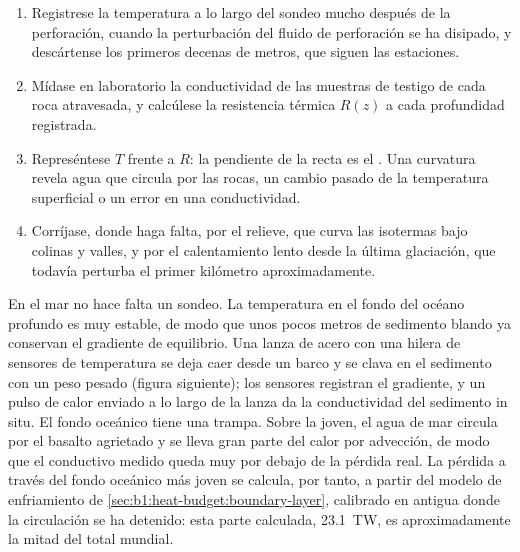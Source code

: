 \begin{method}\label{met:b1:heat-budget:borehole}
\begin{enumerate}
  \item Registrese la temperatura a lo largo del sondeo mucho después de la perforación, cuando la perturbación del fluido de
        perforación se ha disipado, y descártense los primeros decenas de metros, que siguen las estaciones.
  \item Mídase en laboratorio la conductividad de las muestras de testigo de cada roca atravesada, y calcúlese la resistencia
        térmica $R(z)$ a cada profundidad registrada.
  \item Represéntese $T$ frente a $R$: la pendiente de la recta es el . Una curvatura revela agua que circula por
        las rocas, un cambio pasado de la temperatura superficial o un error en una conductividad.
  \item Corríjase, donde haga falta, por el relieve, que curva las isotermas bajo colinas y valles, y por el calentamiento lento
        desde la última glaciación, que todavía perturba el primer kilómetro aproximadamente.
\end{enumerate}
\end{method}

En el mar no hace falta un sondeo. La temperatura en el fondo del océano profundo es muy estable, de modo que unos pocos metros de
sedimento blando ya conservan el gradiente de equilibrio. Una lanza de acero con una hilera de sensores de temperatura se deja
caer desde un barco y se clava en el sedimento con un peso pesado (figura siguiente); los sensores registran el gradiente, y un
pulso de calor enviado a lo largo de la lanza da la conductividad del sedimento in situ. El fondo oceánico tiene una trampa. Sobre
la  joven, el agua de mar circula por el basalto agrietado y se lleva gran parte del calor por advección, de modo que el
 conductivo medido queda muy por debajo de la pérdida real. La pérdida a través del fondo oceánico más joven se
calcula, por tanto, a partir del modelo de enfriamiento de \cref{sec:b1:heat-budget:boundary-layer}, calibrado en  antigua
donde la circulación se ha detenido: esta parte calculada, \qty{23.1}{TW}, es aproximadamente la mitad del total mundial.

